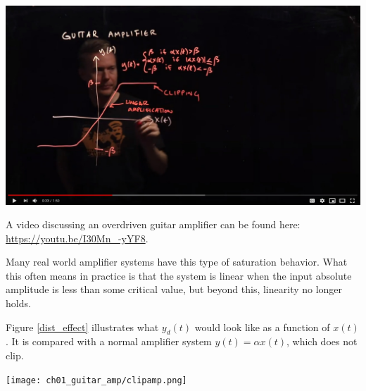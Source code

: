 \begin{marginfigure}
  \begin{center}
    \includegraphics[width=\textwidth]{ch04/figures/ampvid.jpg}
  \end{center}
  \caption{A video discussing an overdriven guitar amplifier can be found here: \url{https://youtu.be/I30Mn_-yYF8}.}
\end{marginfigure}
Many real world amplifier systems have this type of saturation behavior. What this often means in practice is that the system is linear when the input absolute amplitude is less than some critical value, but beyond this, linearity no longer holds.

Figure \ref{dist_effect} illustrates what $y_d(t)$ would look like as a function of $x(t)$. It is compared with a normal amplifier system $y(t)=\alpha x(t)$, which does not clip.

\begin{center}
\texttt{[image: ch01\_guitar\_amp/clipamp.png]}
\end{center}
\fi
